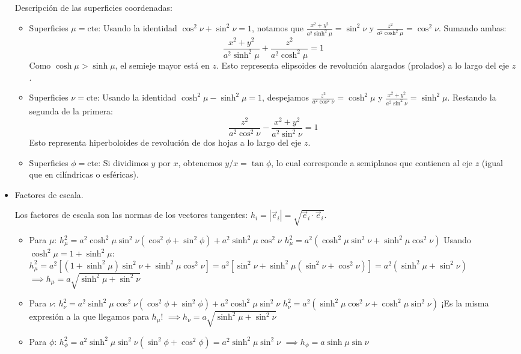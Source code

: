 \documentclass[11pt,spanish]{article}
\begin{document}
\begin{itemize}
Descripción de las superficies coordenadas:
\begin{itemize}
\item Superficies $\mu = \text{cte}$: Usando la identidad $\cos^2\nu + \sin^2\nu = 1$, notamos que $\frac{x^2+y^2}{a^2\sinh^2\mu} = \sin^2\nu$ y $\frac{z^2}{a^2\cosh^2\mu} = \cos^2\nu$. Sumando ambas:
    $$\frac{x^2+y^2}{a^2\sinh^2\mu} + \frac{z^2}{a^2\cosh^2\mu} = 1$$
    Como $\cosh\mu > \sinh\mu$, el semieje mayor está en $z$. Esto representa elipsoides de revolución alargados (prolados) a lo largo del eje $z$.
\item Superficies $\nu = \text{cte}$: Usando la identidad $\cosh^2\mu - \sinh^2\mu = 1$, despejamos $\frac{z^2}{a^2\cos^2\nu} = \cosh^2\mu$ y $\frac{x^2+y^2}{a^2\sin^2\nu} = \sinh^2\mu$. Restando la segunda de la primera:
    $$\frac{z^2}{a^2\cos^2\nu} - \frac{x^2+y^2}{a^2\sin^2\nu} = 1$$
    Esto representa hiperboloides de revolución de dos hojas a lo largo del eje $z$.
\item Superficies $\phi = \text{cte}$: Si dividimos $y$ por $x$, obtenemos $y/x = \tan\phi$, lo cual corresponde a semiplanos que contienen al eje $z$ (igual que en cilíndricas o esféricas).
\end{itemize}

\item Factores de escala.

Los factores de escala son las normas de los vectores tangentes: $h_i = |\vec{e}_i| = \sqrt{\vec{e}_i \cdot \vec{e}_i}$.
\begin{itemize}
\item Para $\mu$:
    $h_\mu^2 = a^2 \cosh^2\mu \sin^2\nu (\cos^2\phi + \sin^2\phi) + a^2 \sinh^2\mu \cos^2\nu$
    $h_\mu^2 = a^2 (\cosh^2\mu \sin^2\nu + \sinh^2\mu \cos^2\nu)$
    Usando $\cosh^2\mu = 1 + \sinh^2\mu$:
    $h_\mu^2 = a^2 [ (1 + \sinh^2\mu)\sin^2\nu + \sinh^2\mu \cos^2\nu ] = a^2 [ \sin^2\nu + \sinh^2\mu(\sin^2\nu + \cos^2\nu) ] = a^2 (\sinh^2\mu + \sin^2\nu)$
    $\implies h_\mu = a \sqrt{\sinh^2\mu + \sin^2\nu}$

\item Para $\nu$:
    $h_\nu^2 = a^2 \sinh^2\mu \cos^2\nu (\cos^2\phi + \sin^2\phi) + a^2 \cosh^2\mu \sin^2\nu$
    $h_\nu^2 = a^2 (\sinh^2\mu \cos^2\nu + \cosh^2\mu \sin^2\nu)$
    ¡Es la misma expresión a la que llegamos para $h_\mu$!
    $\implies h_\nu = a \sqrt{\sinh^2\mu + \sin^2\nu}$

\item Para $\phi$:
    $h_\phi^2 = a^2 \sinh^2\mu \sin^2\nu (\sin^2\phi + \cos^2\phi) = a^2 \sinh^2\mu \sin^2\nu$
    $\implies h_\phi = a \sinh\mu \sin\nu$
\end{itemize}


\end{itemize}
\end{document}
